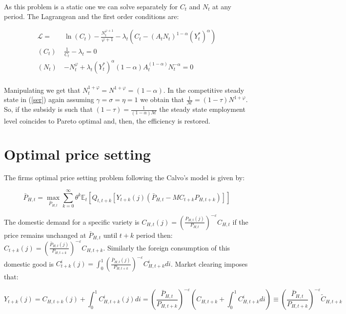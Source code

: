 \documentclass{article}
\newcommand{\Et}{\mathbb{E}_t}
\begin{document}
As this problem is a static one we can solve separately for $C_t$ and $N_t$ at any period. The Lagrangean and the first order conditions are:

\begin{equation*}
    \begin{split}
        \mathcal L = & \ln(C_t) - \frac{N_t^{\varphi+1}}{\varphi+1} - \lambda_t(C_t - (A_t N_t)^{1-\alpha}(Y_t^*)^\alpha) \\
        (C_t) \ & \frac{1}{C_t} - \lambda_t = 0\\
        (N_t) \ & -N_t^\varphi + \lambda_t (Y_t^*)^\alpha (1 - \alpha) A_t^{(1 - \alpha)}N_t^{-\alpha} = 0\\
    \end{split}
\end{equation*}

Manipulating we get that $N_t^{1+\varphi} = N^{1+\varphi} = (1-\alpha)$. In the competitive steady state in (\ref{ser}) again assuming $\gamma = \sigma = \eta = 1$ we obtain that $\frac{1}{\mathcal M} = (1-\tau) N^{1+\varphi}$. So, if the subsidy is such that $(1-\tau) = \frac{1}{(1-\alpha) \mathcal M}$ the steady state employment level coincides to Pareto optimal and, then, the efficiency is restored.

\section{Optimal price setting}
The firms optimal price setting problem following the Calvo's model is given by:

\begin{equation}
    \bar P_{H,t} = \max_{\bar P_{H,t}} \sum^\infty_{k=0} \theta^k \Et \left[ Q_{t, t+k}[Y_{t+k}(j) (\bar P_{H,t} - MC_{t+k} P_{H,t+k})] \right]
\end{equation}

The domestic demand for a specific variety is $C_{H,t}(j) = \left( \frac{P_{H,t}(j)}{P_{H,t}} \right)^{-\varepsilon} C_{H, t}$ if the price remains unchanged at $\bar P_{H,t}$ until $t+k$ period then: $C_{t+k}(j) = \left( \frac{\bar P_{H,t}(j)}{P_{H,t+k}}\right)^{-\varepsilon} C_{H, t+k}$. Similarly the foreign consumption of this domestic good is $C^i_{t+k}(j) = \int^1_0 \left( \frac{\bar P_{H,t}(j)}{P_{H,t+k}} \right)^{-\varepsilon} C^i_{H, t+k} di$. Market clearing imposes that:

\begin{equation}
    Y_{t+k}(j) = C_{H,t+k}(j) + \int_0^1 C^i_{H, t+k}(j) di = \left( \frac{\bar P_{H,t}}{P_{H,t+k}} \right)^{-\varepsilon} \left(C_{H,t+k} +  \int_0^1 C^i_{H, t+k} di \right) \equiv \left( \frac{\bar P_{H,t}}{P_{H,t+k}} \right)^{-\varepsilon} \tilde C_{H,t+k}
\end{equation}
\end{document}
